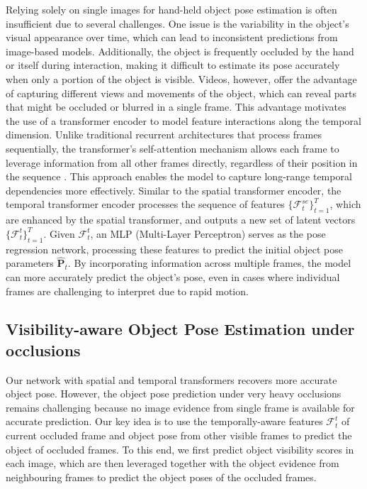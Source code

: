 Relying solely on single images for hand-held object pose estimation is often insufficient due to several challenges. One issue is the variability in the object's visual appearance over time, which can lead to inconsistent predictions from image-based models. Additionally, the object is frequently occluded by the hand or itself during interaction, making it difficult to estimate its pose accurately when only a portion of the object is visible. Videos, however, offer the advantage of capturing different views and movements of the object, which can reveal parts that might be occluded or blurred in a single frame. This advantage motivates the use of a transformer encoder to model feature interactions along the temporal dimension. Unlike traditional recurrent architectures that process frames sequentially, the transformer's self-attention mechanism allows each frame to leverage information from all other frames directly, regardless of their position in the sequence \cite{vaswani2017attention}. This approach enables the model to capture long-range temporal dependencies more effectively. Similar to the spatial transformer encoder, the temporal transformer encoder processes the sequence of features $\lbrace\mathcal{F}^{se}_t\rbrace_{t=1}^{T}$, which are enhanced by the spatial transformer, and outputs a new set of latent vectors $\lbrace\mathcal{F}^{t}_t\rbrace_{t=1}^{T}$. Given $\mathcal{F}^t_t$, an MLP (Multi-Layer Perceptron) serves as the pose regression network, processing these features to predict the initial object pose parameters $\hat{\mathbf{P}}_t$. By incorporating information across multiple frames, the model can more accurately predict the object's pose, even in cases where individual frames are challenging to interpret due to rapid motion. 

\subsection{Visibility-aware Object Pose Estimation under occlusions}

Our network with spatial and temporal transformers recovers more accurate object pose. However, the object pose prediction under very heavy occlusions remains challenging because no image evidence from single frame is available for accurate prediction. Our key idea is to use the temporally-aware features $\mathcal{F}^t_t$ of current occluded frame and object pose from other visible frames to predict the object of occluded frames. To this end, we first predict object visibility scores in each image, which are then leveraged together with the object evidence from neighbouring frames to predict the object poses of the occluded frames.

